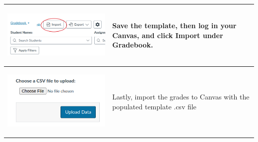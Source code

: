 \documentclass{article}
\begin{document}
{\begin{longtable}{|l|l|}
\hline
\begin{parbox}{0.45\textwidth}{\includegraphics[width=.45\textwidth]{gradebookImport.png} }
\end{parbox}&\begin{parbox}{0.45\textwidth}{Save the template, then log in your Canvas, and click Import under Gradebook.}
\end{parbox}\\
\hline
\begin{parbox}{0.45\textwidth}{\includegraphics[width=.45\textwidth]{chooseScoreCSV.png} }
\end{parbox}&\begin{parbox}{0.45\textwidth}{Lastly, import the grades to Canvas with the populated template .csv file}
\end{parbox}\\
\hline
\end{longtable}
} 
\end{document}
